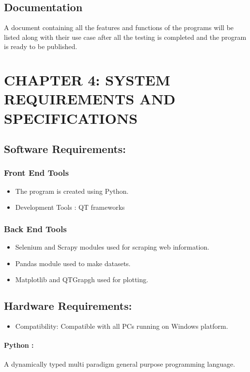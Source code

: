 \documentclass{article}
\begin{document}
\subsection{Documentation}
A document containing all the features and functions of the programs will be listed along with their use case after all the testing is completed and the program 
is ready to be published.


\clearpage

\section{CHAPTER 4: SYSTEM REQUIREMENTS AND SPECIFICATIONS}

\subsection{Software Requirements:}
\vspace*{5mm}
\subsubsection{Front End Tools}
\begin{itemize}
    \item The program is created using Python.
    \item Development Tools : QT frameworks    
\end{itemize}
\subsubsection{Back End Tools}
\begin{itemize}
    \item Selenium and Scrapy modules used for scraping web information.
    \item Pandas module used to make datasets.
    \item Matplotlib and QTGrapgh used for plotting.
\end{itemize}
\subsection{Hardware Requirements:}
\begin{itemize}
    \item Compatibility: Compatible with all PCs running on Windows platform.
\end{itemize}

\vspace*{20mm}
\paragraph{Python :} A dynamically typed multi paradigm general purpose programming language.
\end{document}
